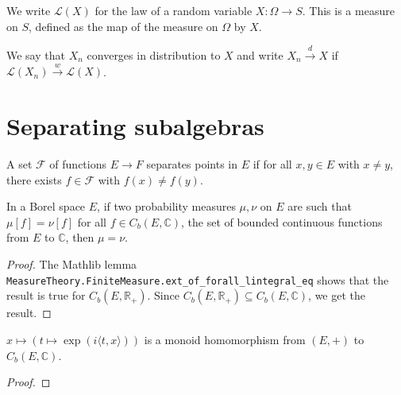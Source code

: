We write $\mathcal L(X)$ for the law of a random variable $X : \Omega \to S$. This is a measure on $S$, defined as the map of the measure on $\Omega$ by $X$.

\begin{definition}\label{def:cvg_distribution}
\mathlibok
{}
We say that $X_n$ converges in distribution to $X$ and write $X_n \xrightarrow{d} X$ if $\mathcal L(X_n) \xrightarrow{w} \mathcal L(X)$.
\end{definition}

\chapter{Separating subalgebras}

\begin{definition}\label{def:separates_points}
\mathlibok
{}
A set $\mathcal F$ of functions $E \to F$ separates points in $E$ if for all $x, y \in E$ with $x \ne y$, there exists $f \in \mathcal F$ with $f(x) \ne f(y)$.
\end{definition}


\begin{lemma}\label{lem:bounded_continuous_separating}
\mathlibok
{}
In a Borel space $E$, if two probability measures $\mu, \nu$ on $E$ are such that $\mu[f] = \nu[f]$ for all $f \in C_b(E, \mathbb{C})$, the set of bounded continuous functions from $E$ to $\mathbb{C}$, then $\mu = \nu$.
\end{lemma}

\begin{proof}\leanok
The Mathlib lemma \texttt{MeasureTheory.FiniteMeasure.ext\_of\_forall\_lintegral\_eq} shows that the result is true for $C_b(E, \mathbb{R}_+)$. Since $C_b(E, \mathbb{R}_{+}) \subseteq C_b(E, \mathbb{C})$, we get the result.
\end{proof}


\begin{lemma}\label{lem:exp_character}
\mathlibok
{}
$x \mapsto (t \mapsto \exp(i \langle t, x \rangle))$ is a monoid homomorphism from $(E,+)$ to $C_b(E, \mathbb{C})$.
\end{lemma}

\begin{proof}\leanok
\end{proof}


